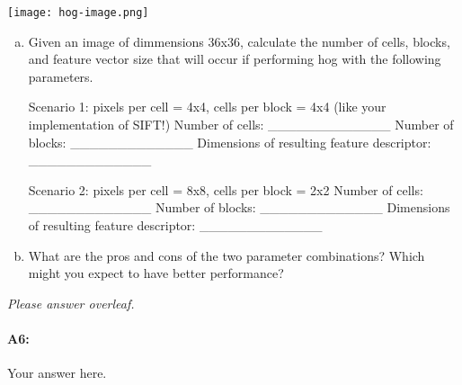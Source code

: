 \texttt{[image: hog-image.png]}

\begin{enumerate}[(a)]
\item Given an image of dimmensions 36x36, calculate the number of cells, blocks, and feature vector size that will occur if performing hog with the following parameters.

Scenario 1: pixels per cell = 4x4, cells per block = 4x4 (like your implementation of SIFT!)
Number of cells: _____________
Number of blocks: _____________
Dimensions of resulting feature descriptor: _____________

Scenario 2: pixels per cell = 8x8, cells per block = 2x2
Number of cells: _____________
Number of blocks: _____________
Dimensions of resulting feature descriptor: _____________


\item What are the pros and cons of the two parameter combinations? Which might you expect to have better performance?
\end{enumerate}

\emph{Please answer overleaf.}

\pagebreak
\paragraph{A6:} Your answer here.










